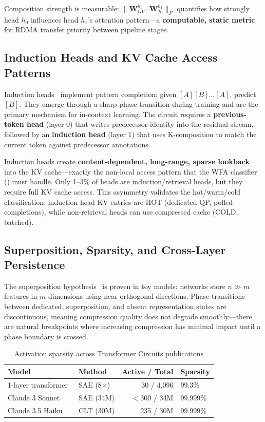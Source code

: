 \documentclass[11pt,letterpaper]{article}
\theoremstyle{definition}
\begin{document}
Composition strength is measurable: $\|\mathbf{W}_{OV}^{h_0} \cdot \mathbf{W}_K^{h_1}\|_F$ quantifies how strongly head $h_0$ influences head $h_1$'s attention pattern---a \textbf{computable, static metric} for RDMA transfer priority between pipeline stages.

\subsection{Induction Heads and KV Cache Access Patterns}

Induction heads~\cite{olsson2022induction} implement pattern completion: given $[A][B]\ldots[A]$, predict $[B]$. They emerge through a sharp phase transition during training and are the primary mechanism for in-context learning. The circuit requires a \textbf{previous-token head} (layer 0) that writes predecessor identity into the residual stream, followed by an \textbf{induction head} (layer 1) that uses K-composition to match the current token against predecessor annotations.

Induction heads create \textbf{content-dependent, long-range, sparse lookback} into the KV cache---exactly the non-local access pattern that the WFA classifier () must handle. Only 1--3\% of heads are induction/retrieval heads, but they require full KV cache access. This asymmetry validates the hot/warm/cold classification: induction head KV entries are HOT (dedicated QP, polled completions), while non-retrieval heads can use compressed cache (COLD, batched).

\subsection{Superposition, Sparsity, and Cross-Layer Persistence}

The superposition hypothesis~\cite{elhage2022superposition} is proven in toy models: networks store $n \gg m$ features in $m$ dimensions using near-orthogonal directions. Phase transitions between dedicated, superposition, and absent representation states are discontinuous, meaning compression quality does not degrade smoothly---there are natural breakpoints where increasing compression has minimal impact until a phase boundary is crossed.

\begin{table}[htbp]
\centering
\caption{Activation sparsity across Transformer Circuits publications}
\label{tab:sparsity}
\begin{tabular}{@{}llrl@{}}
\toprule
\textbf{Model} & \textbf{Method} & \textbf{Active / Total} & \textbf{Sparsity} \\
\midrule
1-layer transformer~\cite{bricken2023monosemantic} & SAE (8$\times$) & 30 / 4,096 & 99.3\% \\
Claude 3 Sonnet~\cite{templeton2024scaling} & SAE (34M) & $<$300 / 34M & 99.999\% \\
Claude 3.5 Haiku~\cite{lindsey2025biology} & CLT (30M) & 235 / 30M & 99.999\% \\
\bottomrule
\end{tabular}
\end{table}
\end{document}

